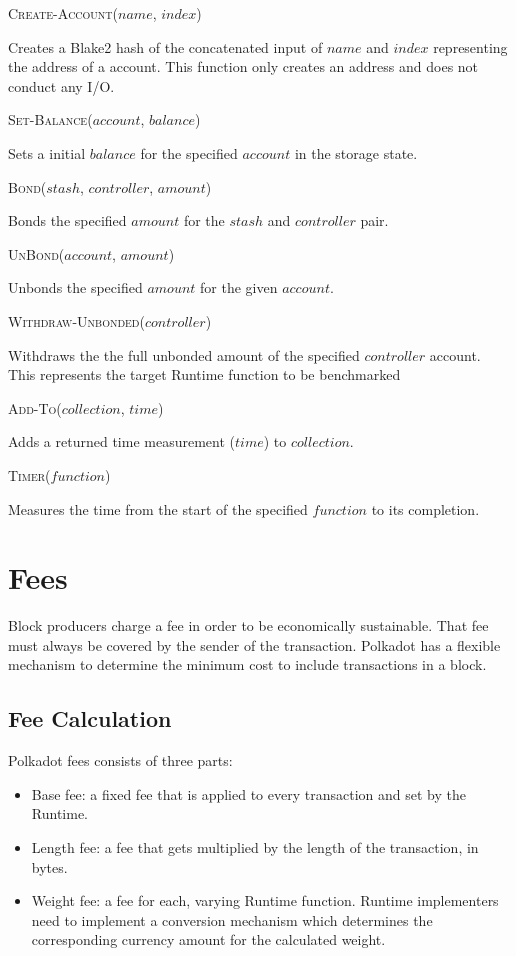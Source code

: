 \documentclass[11pt,a4paper]{article}
\newcommand{\SubItem}[1]{
    {\setlength\itemindent{15pt} \item[-] #1}
}
\begin{document}
\begin{itemize}
  \item \textsc{Create-Account($name$, $index$)} \SubItem{Creates a Blake2 hash
    of the concatenated input of $name$ and $index$ representing the address of
    a account. This function only creates an address and does not conduct any
    I/O.}
  \item \textsc{Set-Balance($account$, $balance$)} \SubItem{Sets a initial
      $balance$ for the specified $account$ in the storage state.}
  \item \textsc{Bond($stash$, $controller$, $amount$)} \SubItem{Bonds the
    specified $amount$ for the $stash$ and $controller$ pair.}
  \item \textsc{UnBond($account$, $amount$)} \SubItem{Unbonds the specified
    $amount$ for the given $account$.}
  \item \textsc{Withdraw-Unbonded($controller$)} \SubItem{Withdraws the the full
    unbonded amount of the specified $controller$ account. This represents the
    target Runtime function to be benchmarked}
  \item \textsc{Add-To($collection$, $time$)} \SubItem{Adds a returned time
    measurement ($time$) to $collection$.}
  \item \textsc{Timer($function$)} \SubItem{Measures the time from the start of
    the specified $function$ to its completion.}
\end{itemize}

\section{Fees}
Block producers charge a fee in order to be economically sustainable. That fee
must always be covered by the sender of the transaction. Polkadot has a flexible
mechanism to determine the minimum cost to include transactions in a block.

\subsection{Fee Calculation}\label{sec:fee-calculation}
Polkadot fees consists of three parts:

\begin{itemize}
\item Base fee: a fixed fee that is applied to every transaction and set by the
Runtime.
\item Length fee: a fee that gets multiplied by the length of the transaction,
in bytes.
\item Weight fee: a fee for each, varying Runtime function. Runtime implementers
      need to implement a conversion mechanism which determines the
      corresponding currency amount for the calculated weight.
\end{itemize}
\end{document}
